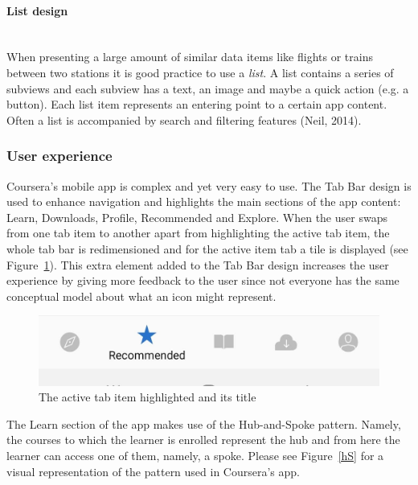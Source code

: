 \documentclass[version=last,fontsize=13pt]{scrartcl}
\newcommand{\myparagraph}[1]{\paragraph{#1}\mbox{}\\}
\begin{document}
		\myparagraph{List design}
		\indent
		When presenting a large amount of similar data items like flights or trains between two stations it is good practice to use a \textit{list}. A list contains a series of subviews and each subview has a text, an image and maybe a quick action (e.g. a button). Each list item represents an entering point to a certain app content. Often a list is accompanied by search and filtering features (Neil, 2014).

		\subsubsection{User experience}

		Coursera's mobile app is complex and yet very easy to use. The Tab Bar design is used to enhance navigation and highlights the main sections of the app content: Learn, Downloads, Profile, Recommended and Explore. When the user swaps from one tab item to another apart from highlighting the active tab item, the whole tab bar is redimensioned and for the active item tab a tile is displayed (see Figure~\ref{tabB}). This extra element added to the Tab Bar design increases the user experience by giving more feedback to the user since not everyone has the same conceptual model about what an icon might represent.
		\begin{figure}[H]

			\centering	
			\includegraphics[scale = 0.3]{./imgs/tabBar.jpg}
			\caption{The active tab item highlighted and its title}
			\label{tabB}

		\end{figure}

		The Learn section of the app makes use of the Hub-and-Spoke pattern. Namely,  the courses to which the learner is enrolled represent the hub and from here the learner can access one of them, namely, a spoke. Please see Figure~\ref{hS} for a visual representation of the pattern used in Coursera's app.
\end{document}
